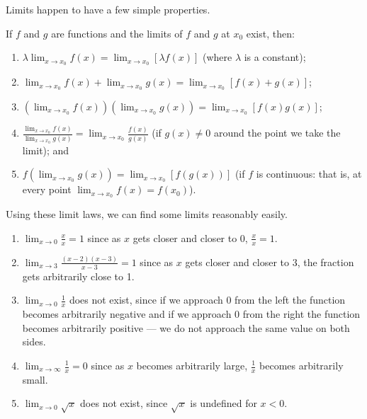 Limits happen to have a few simple properties.
\begin{thm}
  If $ f $ and $ g $ are functions and the limits of $ f $ and $ g $ at $ x_0 $ exist, then:
  \begin{enumerate}
    \item $ \displaystyle \lambda \lim_{x \to x_0} f(x) = \lim_{x \to x_0} [\lambda f(x)] $ (where $ \lambda $ is a constant);
    \item $ \displaystyle \lim_{x \to x_0} f(x) + \lim_{x \to x_0} g(x) = \lim_{x \to x_0} [f(x) + g(x)] $;
    \item $ \displaystyle \left(\lim_{x \to x_0} f(x)\right)\left(\lim_{x \to x_0} g(x)\right) = \lim_{x \to x_0} [f(x)g(x)] $;
    \item $ \displaystyle \frac{\lim_{x \to x_0} f(x)}{\lim_{x \to x_0} g(x)} = \lim_{x \to x_0} \frac{f(x)}{g(x)} $ (if $ g(x) \neq 0 $ around
          the point we take the limit); and
    \item $ \displaystyle f(\lim_{x \to x_0} g(x)) = \lim_{x \to x_0} [f(g(x))] $ (if $ f $ is continuous: that is, at every
          point $ \lim_{x \to x_0} f(x) = f(x_0) $).
  \end{enumerate}
\end{thm}

\begin{exs}
  Using these limit laws, we can find some limits reasonably easily.
  \begin{enumerate}
    \item $ \lim_{x \to 0} \frac{x}{x} = 1 $ since as $ x $ gets closer and closer to $ 0 $, $ \frac{x}{x} = 1 $.
    \item $ \lim_{x \to 3} \frac{(x - 2)(x - 3)}{x - 3} = 1 $ since as $ x $ gets closer and closer to 3, the fraction gets arbitrarily close to 1.
    \item $ \lim_{x \to 0} \frac{1}{x} $ does not exist, since if we approach 0 from the left the function becomes arbitrarily negative
          and if we approach 0 from the right the function becomes arbitrarily positive --- we do not approach the same value on both sides.
    \item $ \lim_{x \to \infty} \frac{1}{x} = 0 $ since as $ x $ becomes arbitrarily large, $ \frac{1}{x} $ becomes arbitrarily small.
    \item $ \lim_{x \to 0} \sqrt{x} $ does not exist, since $ \sqrt{x} $ is undefined for $ x < 0 $.
  \end{enumerate}
\end{exs}

